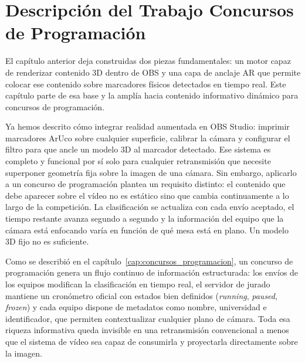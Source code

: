 \chapter{Descripción del Trabajo Concursos de Programación}

\label{cap:descripcionTrabajoConcursosProgramacion}


El capítulo anterior deja construidas dos piezas fundamentales: un motor capaz de renderizar contenido 3D dentro de OBS y una capa de anclaje AR que permite colocar ese contenido sobre marcadores físicos detectados en tiempo real. Este capítulo parte de esa base y la amplía hacia contenido informativo dinámico para concursos de programación.

Ya hemos descrito cómo integrar realidad aumentada en OBS Studio: imprimir marcadores ArUco sobre cualquier superficie, calibrar la cámara y configurar el filtro para que ancle un modelo 3D al marcador detectado. Ese sistema es completo y funcional por sí solo para cualquier retransmisión que necesite superponer geometría fija sobre la imagen de una
cámara. Sin embargo, aplicarlo a un concurso de programación plantea un requisito distinto: el contenido que debe aparecer sobre el vídeo no es estático sino que cambia continuamente a lo largo de la competición. La clasificación se actualiza con cada envío aceptado, el tiempo restante avanza segundo a segundo y la información del equipo que la cámara está enfocando varía en función de qué mesa está en plano. Un modelo 3D fijo no es suficiente.
 
Como se describió en el capítulo~\ref{cap:concursos_programacion}, un concurso de programación genera un
flujo continuo de información estructurada: los envíos de los equipos modifican la clasificación
en tiempo real, el servidor de jurado mantiene un cronómetro oficial con estados bien definidos
(\textit{running}, \textit{paused}, \textit{frozen}) y cada equipo dispone de metadatos como
nombre, universidad e identificador, que permiten contextualizar cualquier plano de cámara. Toda
esa riqueza informativa queda invisible en una retransmisión convencional a menos que el sistema
de vídeo sea capaz de consumirla y proyectarla directamente sobre la imagen.
 
